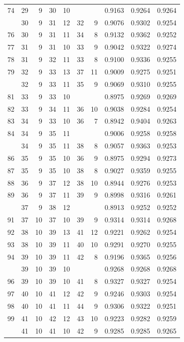 \begin{Schunk}
\begin{longtable}{rrrrrrrrrr}
74 & 29 & 9 & 30 & 10 &  &  & 0.9163 & 0.9264 & 0.9264\\
\addlinespace
75 & 30 & 9 & 31 & 12 & 32 & 9 & 0.9076 & 0.9302 & 0.9254\\
76 & 30 & 9 & 31 & 11 & 34 & 8 & 0.9132 & 0.9362 & 0.9252\\
77 & 31 & 9 & 31 & 10 & 33 & 9 & 0.9042 & 0.9322 & 0.9274\\
78 & 31 & 9 & 32 & 11 & 33 & 8 & 0.9100 & 0.9336 & 0.9255\\
79 & 32 & 9 & 33 & 13 & 37 & 11 & 0.9009 & 0.9275 & 0.9251\\
\addlinespace
80 & 32 & 9 & 33 & 11 & 35 & 9 & 0.9069 & 0.9310 & 0.9255\\
81 & 33 & 9 & 33 & 10 &  &  & 0.8975 & 0.9269 & 0.9269\\
82 & 33 & 9 & 34 & 11 & 36 & 10 & 0.9038 & 0.9284 & 0.9254\\
83 & 34 & 9 & 33 & 10 & 36 & 7 & 0.8942 & 0.9404 & 0.9263\\
84 & 34 & 9 & 35 & 11 &  &  & 0.9006 & 0.9258 & 0.9258\\
\addlinespace
85 & 34 & 9 & 35 & 11 & 38 & 8 & 0.9057 & 0.9363 & 0.9253\\
86 & 35 & 9 & 35 & 10 & 36 & 9 & 0.8975 & 0.9294 & 0.9273\\
87 & 35 & 9 & 35 & 10 & 38 & 8 & 0.9027 & 0.9359 & 0.9255\\
88 & 36 & 9 & 37 & 12 & 38 & 10 & 0.8944 & 0.9276 & 0.9253\\
89 & 36 & 9 & 37 & 11 & 39 & 9 & 0.8998 & 0.9316 & 0.9261\\
\addlinespace
90 & 37 & 9 & 38 & 12 &  &  & 0.8913 & 0.9252 & 0.9252\\
91 & 37 & 10 & 37 & 10 & 39 & 9 & 0.9314 & 0.9314 & 0.9268\\
92 & 38 & 10 & 39 & 13 & 41 & 12 & 0.9221 & 0.9262 & 0.9254\\
93 & 38 & 10 & 39 & 11 & 40 & 10 & 0.9291 & 0.9270 & 0.9255\\
94 & 39 & 10 & 39 & 11 & 42 & 8 & 0.9196 & 0.9365 & 0.9256\\
\addlinespace
95 & 39 & 10 & 39 & 10 &  &  & 0.9268 & 0.9268 & 0.9268\\
96 & 39 & 10 & 39 & 10 & 41 & 8 & 0.9327 & 0.9327 & 0.9254\\
97 & 40 & 10 & 41 & 12 & 42 & 9 & 0.9246 & 0.9303 & 0.9254\\
98 & 40 & 10 & 41 & 11 & 44 & 9 & 0.9306 & 0.9322 & 0.9251\\
99 & 41 & 10 & 42 & 12 & 43 & 10 & 0.9223 & 0.9282 & 0.9259\\
\addlinespace
100 & 41 & 10 & 41 & 10 & 42 & 9 & 0.9285 & 0.9285 & 0.9265\\*
\end{longtable}

\end{Schunk}


